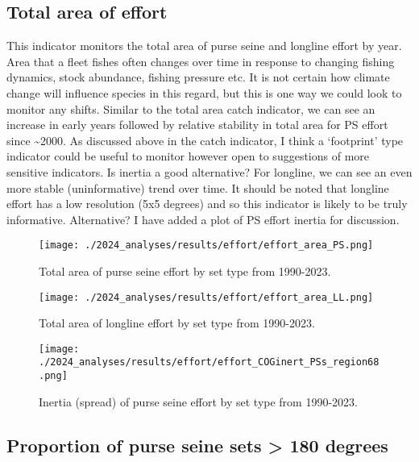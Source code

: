 \documentclass[
]{article}
\begin{document}
\clearpage

\hypertarget{total-area-of-effort}{%
\subsection{Total area of effort}\label{total-area-of-effort}}

This indicator monitors the total area of purse seine and longline
effort by year. Area that a fleet fishes often changes over time in
response to changing fishing dynamics, stock abundance, fishing pressure
etc. It is not certain how climate change will influence species in this
regard, but this is one way we could look to monitor any shifts. Similar
to the total area catch indicator, we can see an increase in early years
followed by relative stability in total area for PS effort since
\textasciitilde2000. As discussed above in the catch indicator, I think
a `footprint' type indicator could be useful to monitor however open to
suggestions of more sensitive indicators. Is inertia a good alternative?
For longline, we can see an even more stable (uninformative) trend over
time. It should be noted that longline effort has a low resolution (5x5
degrees) and so this indicator is likely to be truly informative.
Alternative? I have added a plot of PS effort inertia for discussion.

\begin{figure}
\centering
\texttt{[image: ./2024\_analyses/results/effort/effort\_area\_PS.png]}
\caption{Total area of purse seine effort by set type from 1990-2023.}
\end{figure}

\begin{figure}
\centering
\texttt{[image: ./2024\_analyses/results/effort/effort\_area\_LL.png]}
\caption{Total area of longline effort by set type from 1990-2023.}
\end{figure}

\begin{figure}
\centering
\texttt{[image: ./2024\_analyses/results/effort/effort\_COGinert\_PSs\_region68.png]}
\caption{Inertia (spread) of purse seine effort by set type from
1990-2023.}
\end{figure}

\clearpage

\hypertarget{proportion-of-purse-seine-sets-180-degrees}{%
\subsection{Proportion of purse seine sets \textgreater{} 180
degrees}\label{proportion-of-purse-seine-sets-180-degrees}}
\end{document}
